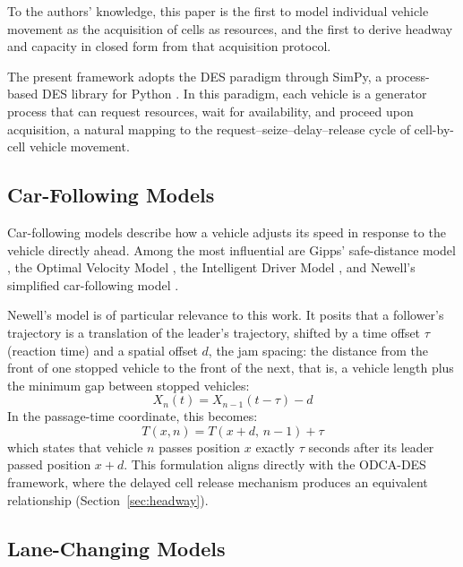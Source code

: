 \documentclass[review,number]{elsarticle}
\begin{document}
To the authors' knowledge, this paper is the first to model individual vehicle movement as the acquisition of cells as resources, and the first to derive headway and capacity in closed form from that acquisition protocol.

The present framework adopts the DES paradigm through SimPy, a process-based DES library for Python \citep{simpy2023}. In this paradigm, each vehicle is a generator process that can request resources, wait for availability, and proceed upon acquisition, a natural mapping to the request--seize--delay--release cycle of cell-by-cell vehicle movement.

\subsection{Car-Following Models}
\label{sec:lit_cf}

Car-following models describe how a vehicle adjusts its speed in response to the vehicle directly ahead. Among the most influential are Gipps' safe-distance model \citep{gipps1981behavioural}, the Optimal Velocity Model \citep{bando1995dynamical}, the Intelligent Driver Model \citep{treiber2000congested}, and Newell's simplified car-following model \citep{newell2002simplified}.

Newell's model is of particular relevance to this work. It posits that a follower's trajectory is a translation of the leader's trajectory, shifted by a time offset $\tau$ (reaction time) and a spatial offset $d$, the jam spacing: the distance from the front of one stopped vehicle to the front of the next, that is, a vehicle length plus the minimum gap between stopped vehicles:
\begin{equation}
    X_{n}(t) = X_{n-1}(t - \tau) - d
    \label{eq:newell_cf}
\end{equation}
In the passage-time coordinate, this becomes:
\begin{equation}
    T(x, n) = T(x + d,\, n-1) + \tau
    \label{eq:newell_cf_Txn}
\end{equation}
which states that vehicle $n$ passes position $x$ exactly $\tau$ seconds after its leader passed position $x + d$. This formulation aligns directly with the ODCA-DES framework, where the delayed cell release mechanism produces an equivalent relationship (Section~\ref{sec:headway}).

\subsection{Lane-Changing Models}
\label{sec:lit_lc}
\end{document}
